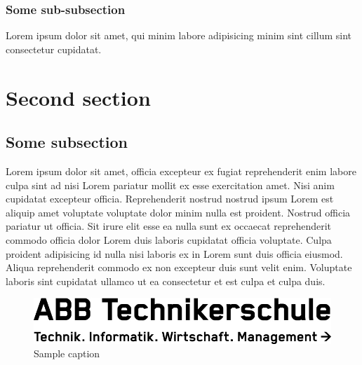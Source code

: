 \documentclass[12pt]{article}
\begin{document}
\subsubsection{Some sub-subsection}
Lorem ipsum dolor sit amet, qui minim labore adipisicing minim sint cillum sint consectetur cupidatat.

\newpage

\section{Second section}
\subsection{Some subsection}
Lorem ipsum dolor sit amet, officia excepteur ex fugiat reprehenderit enim labore culpa sint ad nisi Lorem pariatur mollit ex esse exercitation amet. Nisi anim cupidatat excepteur officia. Reprehenderit nostrud nostrud ipsum Lorem est aliquip amet voluptate voluptate dolor minim nulla est proident. Nostrud officia pariatur ut officia. Sit irure elit esse ea nulla sunt ex occaecat reprehenderit commodo officia dolor Lorem duis laboris cupidatat officia voluptate. Culpa proident adipisicing id nulla nisi laboris ex in Lorem sunt duis officia eiusmod. Aliqua reprehenderit commodo ex non excepteur duis sunt velit enim. Voluptate laboris sint cupidatat ullamco ut ea consectetur et est culpa et culpa duis.

\begin{figure}[h]
\centering
\includegraphics[width=\textwidth]{_img/ABBTS_Logo_sw_66mm.jpg}
\caption{Sample caption}
\end{figure}
\end{document}
